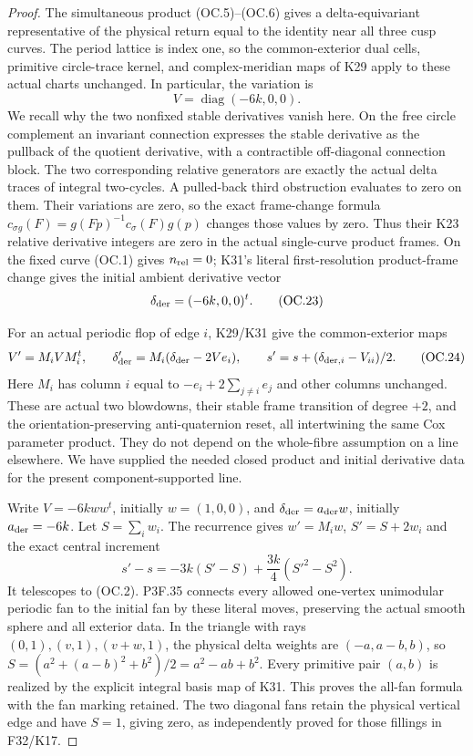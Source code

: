 \begin{proof}
The simultaneous product (OC.5)--(OC.6) gives a delta-equivariant
representative of the physical return equal to the identity near
all three cusp curves. The period lattice is index one, so the
common-exterior dual cells, primitive circle-trace kernel, and
complex-meridian maps of K29 apply to these actual charts unchanged.
In particular, the variation is
\[
       V=\operatorname{diag}(-6k,0,0).
\]
We recall why the two nonfixed stable derivatives vanish here. On
the free circle complement an invariant connection expresses the
stable derivative as the pullback of the quotient derivative, with
a contractible off-diagonal connection block. The two corresponding
relative generators are exactly the actual delta traces of integral
two-cycles. A pulled-back third obstruction evaluates to zero on
them. Their variations are zero, so the exact frame-change formula
\(c_{\sigma g}(F)=g(Fp)^{-1}c_\sigma(F)g(p)\) changes those values by zero.
Thus their K23 relative derivative integers are zero in the actual
single-curve product frames. On the fixed curve (OC.1) gives
\(n_{\rm rel}=0\); K31's literal first-resolution product-frame change gives
the initial ambient derivative vector
\[
                  \delta_{\rm der}=(-6k,0,0)^t.
 \tag{OC.23}
\]

For an actual periodic flop of edge \(i\), K29/K31 give the common-exterior
maps
\[
 V'=M_iVM_i^t,\qquad
 \delta'_{\rm der}=M_i(\delta_{\rm der}-2Ve_i),\qquad
 s'=s+(\delta_{{\rm der},i}-V_{ii})/2.
 \tag{OC.24}
\]
Here \(M_i\) has column \(i\) equal to \(-e_i+2\sum_{j\ne i}e_j\) and other
columns unchanged. These are actual two blowdowns, their stable
frame transition of degree \(+2\), and the orientation-preserving
anti-quaternion reset, all intertwining the same Cox parameter
product. They do not depend on the whole-fibre assumption on a
line elsewhere. We have supplied the needed closed product and
initial derivative data for the present component-supported line.

Write \(V=-6k ww^t\), initially \(w=(1,0,0)\), and
\(\delta_{\rm der}=a_{\rm der}w\), initially \(a_{\rm der}=-6k\). Let \(S=\sum_iw_i\).
The recurrence gives \(w'=M_iw\), \(S'=S+2w_i\) and the exact central
increment
\[
 s'-s=-3k(S'-S)+\frac{3k}{4}(S'^2-S^2).
\]
It telescopes to (OC.2). P3F.35 connects every allowed one-vertex
unimodular periodic fan to the initial fan by these literal moves,
preserving the actual smooth sphere and all exterior data. In the
triangle with rays \((0,1),(v,1),(v+w,1)\), the physical delta weights
are \((-a,a-b,b)\), so
\(S=(a^2+(a-b)^2+b^2)/2=a^2-ab+b^2\). Every primitive pair \((a,b)\) is
realized by the explicit integral basis map of K31. This proves the
all-fan formula with the fan marking retained. The two diagonal
fans retain the physical vertical edge and have \(S=1\), giving zero,
as independently proved for those fillings in F32/K17.


\end{proof}
